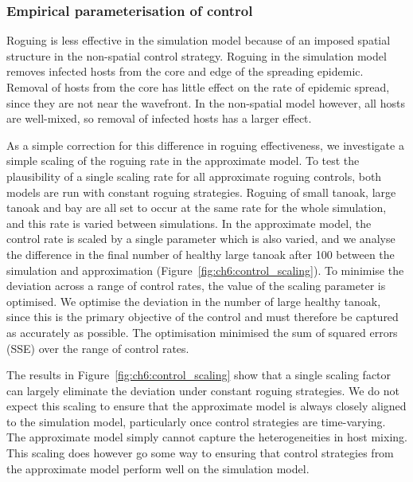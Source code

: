 \subsubsection{Empirical parameterisation of control}\label{sec:ch6:control_scaling}

Roguing is less effective in the simulation model because of an imposed spatial structure in the non-spatial control strategy. Roguing in the simulation model removes infected hosts from the core and edge of the spreading epidemic. Removal of hosts from the core has little effect on the rate of epidemic spread, since they are not near the wavefront. In the non-spatial model however, all hosts are well-mixed, so removal of infected hosts has a larger effect.

As a simple correction for this difference in roguing effectiveness, we investigate a simple scaling of the roguing rate in the approximate model. To test the plausibility of a single scaling rate for all approximate roguing controls, both models are run with constant roguing strategies. Roguing of small tanoak, large tanoak and bay are all set to occur at the same rate for the whole simulation, and this rate is varied between simulations. In the approximate model, the control rate is scaled by a single parameter which is also varied, and we analyse the difference in the final number of healthy large tanoak after \SI{100}{\years} between the simulation and approximation (Figure~\ref{fig:ch6:control_scaling}). To minimise the deviation across a range of control rates, the value of the scaling parameter is optimised. We optimise the deviation in the number of large healthy tanoak, since this is the primary objective of the control and must therefore be captured as accurately as possible. The optimisation minimised the sum of squared errors (SSE) over the range of control rates.

The results in Figure~\ref{fig:ch6:control_scaling} show that a single scaling factor can largely eliminate the deviation under constant roguing strategies. We do not expect this scaling to ensure that the approximate model is always closely aligned to the simulation model, particularly once control strategies are time-varying. The approximate model simply cannot capture the heterogeneities in host mixing. This scaling does however go some way to ensuring that control strategies from the approximate model perform well on the simulation model.

